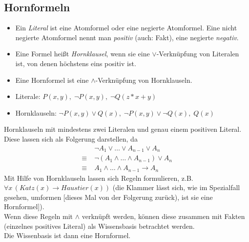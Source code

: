 \subsection{Hornformeln}
\begin{itemize}
\item Ein \emph{Literal} ist eine Atomformel oder eine negierte Atomformel. Eine nicht negierte Atomformel nennt man \emph{positiv} (auch: Fakt), eine negierte \emph{negativ}. 
\item Eine Formel heißt \emph{Hornklausel}, wenn sie eine $\vee$-Verknüpfung von Literalen ist, von denen höchstens eins positiv ist.
\item Eine Hornformel ist eine $\wedge$-Verknüpfung von Hornklauseln.
\end{itemize}

\begin{itemize}
\item Literale: $P(x,y),\; \neg P(x,y), \; \neg Q(z *x+y)$
\item Hornklauseln: $\neg P(x,y) \vee Q(x),\; \neg P(x,y) \vee \neg Q (x), \; Q(x)$
\end{itemize}

 Hornklauseln mit mindestens zwei Literalen und genau einem positiven Literal. Diese lassen sich als Folgerung darstellen, da
\begin{align*}
&\neg A_1 \vee \dots \vee A_{n-1}\vee A_n\\
\equiv\;& \neg (A_1 \wedge \dots \wedge A_{n-1})\vee A_n\\
\equiv\; & A_1 \wedge \dots \wedge A_{n-1} \to A_n
\end{align*}
Mit Hilfe von Hornklauseln lassen sich Regeln formulieren, z.B. $\forall x \, (Katz(x) \to Haustier(x))$ (die Klammer lässt sich, wie im Spezialfall gesehen, umformen [dieses Mal von der Folgerung zurück), ist sie eine Hornformel]).\\
Wenn diese Regeln mit $\wedge$ verknüpft werden, können diese zusammen mit Fakten (einzelnes positives Literal) als Wissensbasis betrachtet werden.\\
Die Wissenbasis ist dann eine Hornformel.

